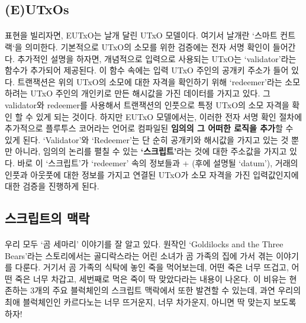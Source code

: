\documentclass[a4paper, 11pt]{article}
\begin{document}
    \subsection{(E)UTxOs}
    
    \paragraph{} 표현을 빌리자면, EUTxO는 날개 달린 UTxO 모델이다. 여기서 날개란 `스마트 컨트랙`을 의미한다. 기본적으로 UTxO의 소모를 위한 검증에는 전자 서명 확인이 들어간다. 추가적인 설명을 하자면, 개념적으로 입력으로 사용되는 UTxO는 `validator'라는 함수가 추가되어 제공된다. 이 함수 속에는 입력 UTxO 주인의 공개키 주소가 들어 있다. 트랜잭션은 위의 UTxO의 소모에 대한 자격을 확인하기 위해 `redeemer'라는 소모하려는 UTxO 주인의 개인키로 만든 해시값을 가진 데이터를 가지고 있다. 그 validator와 redeemer를 사용해서 트랜잭션의 인풋으로 특정 UTxO의 소모 자격을 확인 할 수 있게 되는 것이다. 하지만 EUTxO 모델에서는, 이러한 전자 서명 확인 절차에 추가적으로 플루투스 코어라는 언어로 컴파일된 \textbf{임의의 그 어떠한 로직을 추가}할 수 있게 된다. `Validator'와 `Redeemer'는 단 순히 공개키와 해시값을 가지고 있는 것 뿐만 아니라, 임의의 논리를 펼칠 수 있는 \textbf{`스크립트'}라는 것에 대한 주소값을 가지고 있다. 바로 이 `스크립트'가 `redeemer' 속의 정보들과 + (후에 설명될 `datum'), 거래의 인풋과 아웃풋에 대한 정보를 가지고 연결된 UTxO가 소모 자격을 가진 입력값인지에 대한 검증을 진행하게 된다.

    \subsection{스크립트의 맥락}

    \paragraph{} 우리 모두 `곰 세마리' 이야기를 잘 알고 있다. 원작인 `Goldilocks and the Three Bears'라는 스토리에서는 골디락스라는 어린 소녀가 곰 가족의 집에 가서 겪는 이야기를 다룬다. 거기서 곰 가족의 식탁에 놓인 죽을 먹어보는데, 어떤 죽은 너무 뜨겁고, 어떤 죽은 너무 차갑고, 세번째로 먹은 죽이 딱 맞았다라는 내용이 나온다. 이 비유는 현존하는 3개의 주요 블럭체인의 스크립트 맥락에서 또한 발견할 수 있는데, 과연 우리의 최애 블럭체인인 카르다노는 너무 뜨거운지, 너무 차가운지, 아니면 딱 맞는지 보도록 하자!
    
\end{document}
